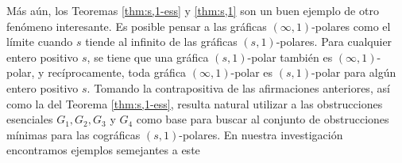 M\'as a\'un, los Teoremas \ref{thm:s,1-ess} y \ref{thm:s,1}
son un buen ejemplo de otro fen\'omeno interesante.   Es
posible pensar a las gr\'aficas $(\infty,1)$-polares como
el l\'imite cuando $s$ tiende al infinito de las gr\'aficas
$(s,1)$-polares.  Para cualquier entero positivo $s$, se
tiene que una gr\'afica $(s,1)$-polar tambi\'en es
$(\infty,1)$-polar, y rec\'iprocamente, toda gr\'afica
$(\infty,1)$-polar es $(s,1)$-polar para alg\'un entero
positivo $s$.   Tomando la contrapositiva de las afirmaciones
anteriores, as\'i como la del Teorema \ref{thm:s,1-ess},
resulta natural utilizar a las obstrucciones esenciales
$G_1, G_2, G_3$ y $G_4$ como base para buscar al conjunto
de obstrucciones m\'inimas para las cogr\'aficas
$(s,1)$-polares.   En nuestra investigación encontramos
ejemplos semejantes a este %

